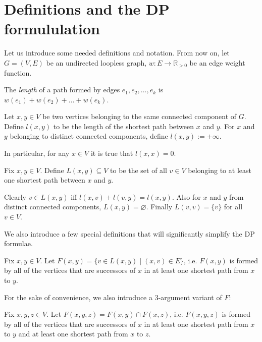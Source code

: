 \section{Definitions and the DP formululation}

Let us introduce some needed definitions and notation. From now on, let $G = (V, E)$ be an undirected loopless graph, $w : E \rightarrow \mathbb{R}_{>0}$ be an edge weight function. 

\begin{definition}
The \emph{length} of a path formed by edges $e_1, e_2, \ldots, e_k$ is $w(e_1) + w(e_2) + \ldots + w(e_k)$.
\end{definition}

\begin{definition} 
Let $x, y \in V$ be two vertices belonging to the same connected component of $G$. Define $l(x, y)$ to be the length of the shortest path between $x$ and $y$. For $x$ and $y$ belonging to distinct connected components, define $l(x, y) := +\infty$.
\end{definition}

In particular, for any $x \in V$ it is true that $l(x, x) = 0$.

\begin{definition} \label{is_between}
Fix $x, y \in V$. Define $L(x, y) \subseteq V$ to be the set of all $v \in V$ belonging to at least one shortest path between $x$ and $y$.
\end{definition}

Clearly $v \in L(x, y)$ iff $l(x, v) + l(v, y) = l(x, y)$. Also for $x$ and $y$ from distinct connected components, $L(x, y) = \varnothing$. Finally $L(v, v) = \{v\}$ for all $v \in V$.

We also introduce a few special definitions that will significantly simplify the DP formulae.

\begin{definition}
Fix $x, y \in V$. Let $F(x, y) = \{v \in L(x, y) \mid (x, v) \in E\}$, i.e. $F(x, y)$ is formed by all of the vertices that are successors of $x$ in at least one shortest path from $x$ to $y$. 
\end{definition}

For the sake of convenience, we also introduce a 3-argument variant of $F$: 

\begin{definition}
Fix $x, y, z \in V$. Let $F(x, y, z) = F(x, y) \cap F(x, z)$, i.e. $F(x, y, z)$ is formed by all of the vertices that are successors of $x$ in at least one shortest path from $x$ to $y$ and at least one shortest path from $x$ to $z$.
\end{definition}

